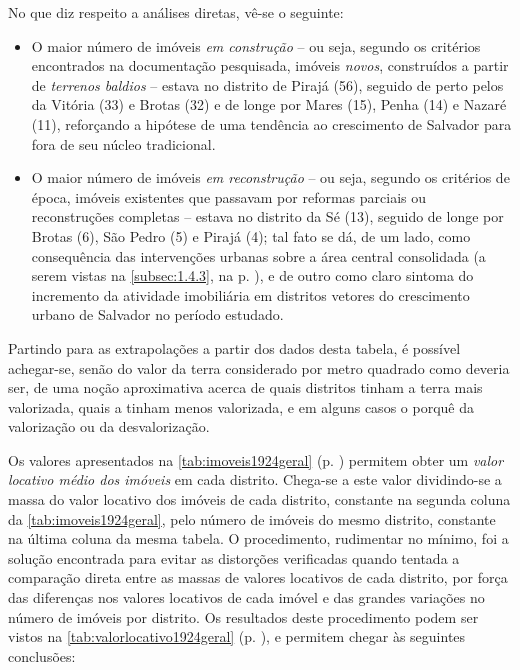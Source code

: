 

No que diz respeito a análises diretas, vê-se o seguinte:

\begin{itemize}
\item O maior número de imóveis \textit{em construção} -- ou seja, segundo os critérios encontrados na documentação pesquisada, imóveis \textit{novos}, construídos a partir de \textit{terrenos baldios} -- estava no distrito de Pirajá (56), seguido de perto pelos da Vitória (33) e Brotas (32) e de longe por Mares (15), Penha (14) e Nazaré (11), reforçando a hipótese de uma tendência ao crescimento de Salvador para fora de seu núcleo tradicional.
\item O maior número de imóveis \textit{em reconstrução} -- ou seja, segundo os critérios de época, imóveis existentes que passavam por reformas parciais ou reconstruções completas -- estava no distrito da Sé (13), seguido de longe por Brotas (6), São Pedro (5) e Pirajá (4); tal fato se dá, de um lado, como consequência das intervenções urbanas sobre a área central consolidada (a serem vistas na \autoref{subsec:1.4.3}, na p. \pageref{subsec:1.4.3}), e de outro como claro sintoma do incremento da atividade imobiliária em distritos vetores do crescimento urbano de Salvador no período estudado.
\end{itemize}

Partindo para as extrapolações a partir dos dados desta tabela, é possível achegar-se, senão do valor da terra considerado por metro quadrado como deveria ser, de uma noção aproximativa acerca de quais distritos tinham a terra mais valorizada, quais a tinham menos valorizada, e em alguns casos o porquê da valorização ou da desvalorização.

Os valores apresentados na \autoref{tab:imoveis1924geral} (p. \pageref{tab:imoveis1924geral}) permitem obter um \textit{valor locativo médio dos imóveis} em cada distrito. Chega-se a este valor dividindo-se a massa do valor locativo dos imóveis de cada distrito, constante na segunda coluna da \autoref{tab:imoveis1924geral}, pelo número de imóveis do mesmo distrito, constante na última coluna da mesma tabela. O procedimento, rudimentar no mínimo, foi a solução encontrada para evitar as distorções verificadas quando tentada a comparação direta entre as massas de valores locativos de cada distrito, por força das diferenças nos valores locativos de cada imóvel e das grandes variações no número de imóveis por distrito. Os resultados deste procedimento podem ser vistos na \autoref{tab:valorlocativo1924geral} (p. \pageref{tab:valorlocativo1924geral}), e permitem chegar às seguintes conclusões:

